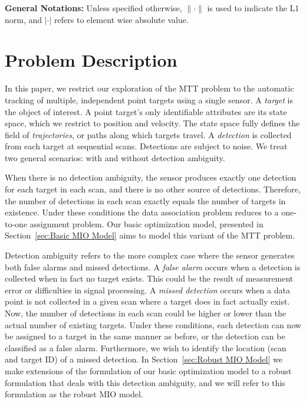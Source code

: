 \documentclass[journal]{IEEEtran}
\begin{document}
{\bf General Notations:}
Unless specified otherwise, $\|\cdot\|$ is used to indicate the L1 norm, and $|\cdot|$ refers to element wise absolute value.

\section{Problem Description}\label{sec:Problem Description}
In this paper, we restrict our exploration of the MTT problem to the automatic tracking of multiple, independent point targets using a single sensor. A \textit{target} is the object of interest. A point target's only identifiable attributes are its state space, which we restrict to position and velocity. The state space fully defines the field of \textit{trajectories}, or paths along which targets travel. A \textit{detection} is collected from each target at sequential scans. Detections are subject to noise. We treat two general scenarios: with and without detection ambiguity. 

When there is no detection ambiguity, the sensor produces exactly one detection for each target in each scan, and there is no other source of detections. Therefore, the number of detections in each scan exactly equals the number of targets in existence. Under these conditions the data association problem reduces to a one-to-one assignment problem. Our basic optimization model, presented in Section~\ref{sec:Basic MIO Model} aims to model this variant of the MTT problem.

Detection ambiguity refers to the more complex case where the sensor generates both false alarms and missed detections. A \textit{false alarm} occurs when a detection is collected when in fact no target exists. This could be the result of measurement error or difficulties in signal processing. A \textit{missed detection} occurs when a data point is not collected in a given scan where a target does in fact actually exist. Now, the number of detections in each scan could be higher or lower than the actual number of existing targets. Under these conditions, each detection can now be assigned to a target in the same manner as before, or the detection can be classified as a false alarm. Furthermore, we wish to identify the location (scan and target ID) of a missed detection. In Section~\ref{sec:Robust MIO Model} we make extensions of the formulation of our basic optimization model to a robust formulation that deals with this detection ambiguity, and we will refer to this formulation as the robust MIO model.
\end{document}
